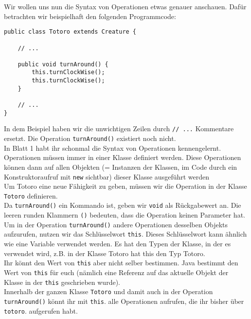 \begin{Infobox}
    Wir wollen uns nun die Syntax von Operationen etwas genauer anschauen. 
    Dafür betrachten wir beispielhaft den folgenden Programmcode:

    \begin{lstlisting}[numbers=none]
public class Totoro extends Creature {

    // ...

    public void turnAround() {
        this.turnClockWise();
        this.turnClockWise();
    }

    // ...
}
    \end{lstlisting}

    In dem Beispiel haben wir die unwichtigen Zeilen durch \lstinline{// ...} Kommentare ersetzt.
Die Operation \lstinline{turnAround()} existiert noch nicht.\\

In Blatt 1 habt ihr schonmal die Syntax von Operationen kennengelernt.
Operationen müssen immer in einer Klasse definiert werden.
Diese Operationen können dann auf allen Objekten (= Instanzen
der Klassen, im Code durch ein Konstruktoraufruf mit \lstinline{new} sichtbar) dieser Klasse ausgeführt
werden\\

Um Totoro eine neue Fähigkeit zu geben, müssen wir die Operation in der Klasse \lstinline{Totoro} definieren.\\

Da \lstinline{turnAround()} ein Kommando ist, geben wir \lstinline{void} als Rückgabewert an.
Die leeren runden Klammern \lstinline{()} bedeuten, dass die Operation keinen Parameter hat.\\

Um in der Operation \lstinline{turnAround()} andere Operationen desselben Objekts aufzurufen, nutzen wir das Schlüsselwort \lstinline{this}.
Dieses Schlüsselwort kann ähnlich wie eine Variable verwendet werden. Es hat den Typen der Klasse, in der es verwendet wird, z.B. in der Klasse Totoro hat this den Typ Totoro.\\

Ihr könnt den Wert von \lstinline{this} aber nicht selber bestimmen.
Java bestimmt den Wert von \lstinline{this} für euch (nämlich eine Referenz auf das aktuelle Objekt der Klasse in der \lstinline{this} geschrieben wurde).\\

Innerhalb der ganzen Klasse \lstinline{Totoro} und damit auch in der Operation \lstinline{turnAround()} könnt ihr mit \lstinline{this}. alle Operationen aufrufen, die ihr bisher über \lstinline{totoro}. aufgerufen habt.

\end{Infobox}


